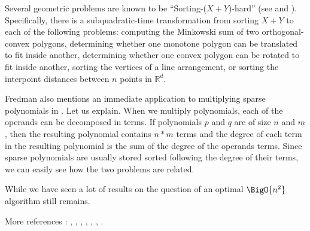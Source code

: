 Several geometric problems are known to be ``Sorting-($X + Y$)-hard'' (see \cite{barrera1996finding} and \cite{barequet2001polygon}). Specifically, there is a subquadratic-time transformation from sorting $X + Y$ to each of the following problems: computing the Minkowski sum of two orthogonal-convex polygons, determining whether one monotone polygon can be translated to fit inside another, determining whether one convex polygon can be rotated to fit inside another, sorting the vertices of a line arrangement, or sorting the interpoint distances between $n$ points in $\mathbb{R}^d$.

Fredman also mentions an immediate application to multiplying sparse polynomials in \cite{fredman1976good}. Let us explain. When we multiply polynomials, each of the operands can be decomposed in terms. If polynomials $p$ and $q$ are of size $n$ and $m$, then the resulting polynomial contains $n * m$ terms and the degree of each term in the resulting polynomial is the sum of the degree of the operands terms. Since sparse polynomials are usually stored sorted following the degree of their terms, we can easily see how the two problems are related.

While we have seen a lot of results on  the question of an optimal $\BigO{n^2}$ algorithm still remains.

More references : \cite{orourke:2012:sortxy}, \cite{kahnkim1}, \cite{dietzfelbinger1989lower}, \cite{steiger1995pseudo}, \cite{lambert1990sorting}, \cite{erickson1997lower}, \cite{bremner2012necklaces}.



